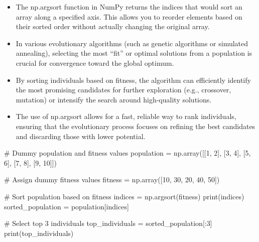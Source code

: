 \documentclass[
  letterpaper,
  DIV=11,
  numbers=noendperiod]{scrreprt}
\newenvironment{Shaded}{\begin{snugshade}}{\end{snugshade}}
\newcommand{\BuiltInTok}[1]{\textcolor[rgb]{0.00,0.23,0.31}{#1}}
\newcommand{\CommentTok}[1]{\textcolor[rgb]{0.37,0.37,0.37}{#1}}
\newcommand{\DecValTok}[1]{\textcolor[rgb]{0.68,0.00,0.00}{#1}}
\newcommand{\NormalTok}[1]{\textcolor[rgb]{0.00,0.23,0.31}{#1}}
\newcommand{\OperatorTok}[1]{\textcolor[rgb]{0.37,0.37,0.37}{#1}}
\begin{document}
\begin{itemize}
\item
  The np.argsort function in NumPy returns the indices that would sort
  an array along a specified axis. This allows you to reorder elements
  based on their sorted order without actually changing the original
  array.
\item
  In various evolutionary algorithms (such as genetic algorithms or
  simulated annealing), selecting the most ``fit'' or optimal solutions
  from a population is crucial for convergence toward the global
  optimum.
\item
  By sorting individuals based on fitness, the algorithm can efficiently
  identify the most promising candidates for further exploration (e.g.,
  crossover, mutation) or intensify the search around high-quality
  solutions.
\item
  The use of np.argsort allows for a fast, reliable way to rank
  individuals, ensuring that the evolutionary process focuses on
  refining the best candidates and discarding those with lower
  potential.
\end{itemize}

\begin{Shaded}
\begin{Highlighting}[]
\CommentTok{\# Dummy population and fitness values}
\NormalTok{population }\OperatorTok{=}\NormalTok{ np.array([[}\DecValTok{1}\NormalTok{, }\DecValTok{2}\NormalTok{], [}\DecValTok{3}\NormalTok{, }\DecValTok{4}\NormalTok{], [}\DecValTok{5}\NormalTok{, }\DecValTok{6}\NormalTok{], [}\DecValTok{7}\NormalTok{, }\DecValTok{8}\NormalTok{], [}\DecValTok{9}\NormalTok{, }\DecValTok{10}\NormalTok{]])}

\CommentTok{\# Assign dummy fitness values}
\NormalTok{fitness }\OperatorTok{=}\NormalTok{ np.array([}\DecValTok{10}\NormalTok{, }\DecValTok{30}\NormalTok{, }\DecValTok{20}\NormalTok{, }\DecValTok{40}\NormalTok{, }\DecValTok{50}\NormalTok{]) }

\CommentTok{\# Sort population based on fitness}
\NormalTok{indices }\OperatorTok{=}\NormalTok{ np.argsort(fitness)}
\BuiltInTok{print}\NormalTok{(indices) }
\NormalTok{sorted\_population }\OperatorTok{=}\NormalTok{ population[indices]}

\CommentTok{\# Select top 3 individuals}
\NormalTok{top\_individuals }\OperatorTok{=}\NormalTok{ sorted\_population[:}\DecValTok{3}\NormalTok{] }
\BuiltInTok{print}\NormalTok{(top\_individuals)}
\end{Highlighting}
\end{Shaded}
\end{document}
